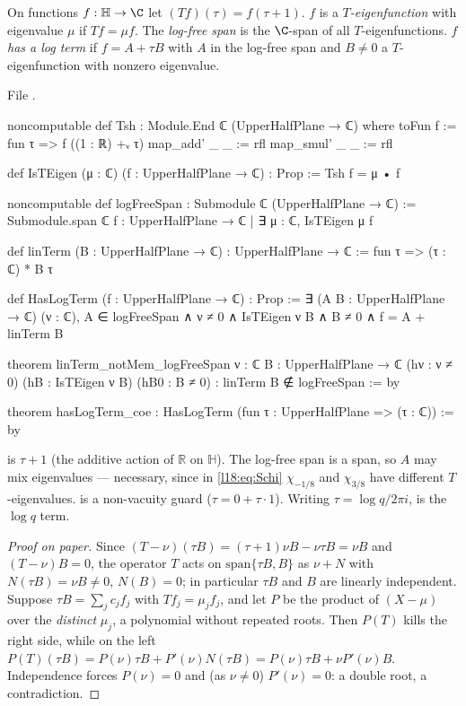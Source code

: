 \begin{definition}\label{l18:def:logterm}
On functions $f:\mathbb H\to\C$ let $(Tf)(\tau)=f(\tau+1)$. $f$ is a \emph{$T$-eigenfunction} with eigenvalue $\mu$ if
$Tf=\mu f$. The \emph{log-free span} is the $\C$-span of all $T$-eigenfunctions. $f$ \emph{has a log term} if
$f=A+\tau B$ with $A$ in the log-free span and $B\ne0$ a $T$-eigenfunction with nonzero eigenvalue.
\end{definition}
\noindent File .
\begin{leancode}
noncomputable def Tsh : Module.End ℂ (UpperHalfPlane → ℂ) where
  toFun f := fun τ => f ((1 : ℝ) +ᵥ τ)
  map_add' _ _ := rfl
  map_smul' _ _ := rfl

def IsTEigen (μ : ℂ) (f : UpperHalfPlane → ℂ) : Prop := Tsh f = μ • f

noncomputable def logFreeSpan : Submodule ℂ (UpperHalfPlane → ℂ) :=
  Submodule.span ℂ {f : UpperHalfPlane → ℂ | ∃ μ : ℂ, IsTEigen μ f}

def linTerm (B : UpperHalfPlane → ℂ) : UpperHalfPlane → ℂ := fun τ => (τ : ℂ) * B τ

def HasLogTerm (f : UpperHalfPlane → ℂ) : Prop :=
  ∃ (A B : UpperHalfPlane → ℂ) (ν : ℂ),
    A ∈ logFreeSpan ∧ ν ≠ 0 ∧ IsTEigen ν B ∧ B ≠ 0 ∧ f = A + linTerm B

theorem linTerm_notMem_logFreeSpan {ν : ℂ} {B : UpperHalfPlane → ℂ} (hν : ν ≠ 0)
    (hB : IsTEigen ν B) (hB0 : B ≠ 0) : linTerm B ∉ logFreeSpan := by

theorem hasLogTerm_coe : HasLogTerm (fun τ : UpperHalfPlane => (τ : ℂ)) := by
\end{leancode}
\begin{dictionary}
 is $\tau+1$ (the additive action of $\mathbb{R}$ on $\mathbb H$). The log-free span is a span, so $A$ may
mix eigenvalues --- necessary, since in \eqref{l18:eq:Schi} $\chi_{-1/8}$ and $\chi_{3/8}$ have different
$T$-eigenvalues.  is a non-vacuity guard ($\tau=0+\tau\cdot1$). Writing $\tau=\log q/2\pi i$,
 is the $\log q$ term.
\end{dictionary}
\begin{proof}[Proof on paper]
Since $(T-\nu)(\tau B)=(\tau+1)\nu B-\nu\tau B=\nu B$ and $(T-\nu)B=0$, the operator $T$ acts on
$\mathrm{span}\{\tau B,B\}$ as $\nu+N$ with $N(\tau B)=\nu B\ne0$, $N(B)=0$; in particular $\tau B$ and $B$ are linearly
independent. Suppose $\tau B=\sum_jc_jf_j$ with $Tf_j=\mu_jf_j$, and let $P$ be the product of $(X-\mu)$ over the
\emph{distinct} $\mu_j$, a polynomial without repeated roots. Then $P(T)$ kills the right side, while on the left
$P(T)(\tau B)=P(\nu)\tau B+P'(\nu)N(\tau B)=P(\nu)\tau B+\nu P'(\nu)B$. Independence forces $P(\nu)=0$ and (as
$\nu\ne0$) $P'(\nu)=0$: a double root, a contradiction.
\end{proof}
